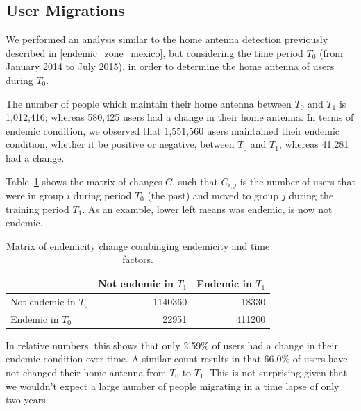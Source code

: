 


\subsection{ User Migrations}\label{subsection:user_migrations} %

We performed an analysis similar to the home antenna detection previously described in \cref{endemic_zone_mexico},
but considering the time period $T_0$ (from January 2014 to July 2015),
in order to determine the home antenna of users during $T_0$.

The number of people which maintain their home antenna between $T_0$ and $T_1$ is 1,012,416;
whereas 580,425 users had a change in their home antenna.
In terms of endemic condition, we observed that 1,551,560 users maintained their endemic condition, whether it be positive or negative,
between $T_0$ and $T_1$, whereas 41,281 had a change.


%
%
%

Table~\cref{tab:changes}
shows the matrix of changes $C$, such that $C_{i, j}$ is the number of users that were in group $i$ during period $T_0$ (the past) and moved to group $j$ during the training period $T_1$. As an example, lower left means was endemic, is now not endemic.

\begin{table}[ht]
	\caption{Matrix of endemicity change combinging endemicity and time factors.}
	\label{tab:changes}
	\centering
	\begin{tabular}{l r r }
		\toprule
		& Not endemic in $T_1$ & Endemic in $T_1$ \\
		\midrule
		Not endemic in $T_0$ & 1140360 & 18330   \\
		Endemic in $T_0$       & 22951    & 411200 \\
		\bottomrule
	\end{tabular}
\end{table}

In relative numbers, this shows that only 2.59\% of users had a change in their endemic condition over time. A similar count results in that 66.0\% of users have not changed their home antenna from $T_0$ to $T_1$. This is not surprising given that we wouldn't expect a large number of people migrating in a time lapse of only two years.



